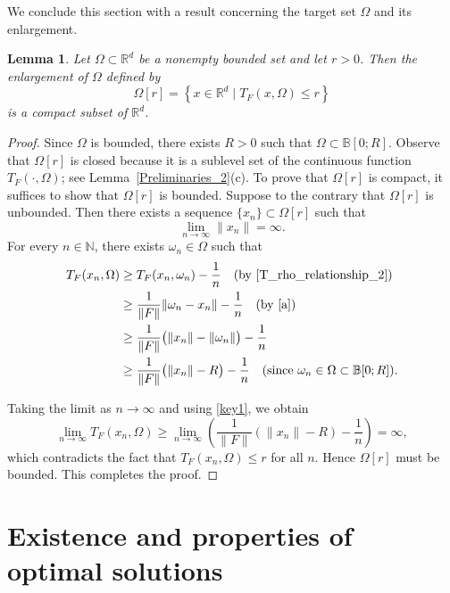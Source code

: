 \documentclass[sn-mathphys-num]{sn-jnl}%
\newtheorem{lemma}[theorem]{Lemma}
\theoremstyle{definition}
\begin{document}
We conclude this section with a result concerning the target set $\Omega$ and its enlargement.

\begin{lemma} 
	\label{G.O.Solution_1}
	Let $\Omega \subset \mathbb{R}^d$ be a nonempty bounded set and let $r>0$. 
	Then the enlargement of $\Omega$ defined by
	\begin{equation} 
		\label{enlargement}
		\Omega[r] = \left\{ x \in \mathbb{R}^d \mid T_F(x,\Omega) \le r \right\}
	\end{equation}
	is a compact subset of $\mathbb{R}^d$.
\end{lemma}

\begin{proof}
	Since $\Omega$ is bounded, there exists $R>0$ such that 
	$\Omega \subset \mathbb{B}[0;R]$. 
	Observe that $\Omega[r]$ is closed because it is a sublevel set of the 
	continuous function $T_F(\cdot,\Omega)$; see Lemma~\ref{Preliminaries_2}(c). 
	To prove that $\Omega[r]$ is compact, it suffices to show that $\Omega[r]$ is bounded.
	Suppose to the contrary that $\Omega[r]$ is unbounded. 
	Then there exists a sequence $\{x_n\}\subset \Omega[r]$ such that
	\begin{equation}
		\label{key1}
		\lim_{n\to\infty}\|x_n\|=\infty .
	\end{equation}
	For every $n\in\mathbb{N}$, there exists $\omega_n\in\Omega$ such that
	\[
	\begin{aligned}
		T_F(x_n,\Omega)
		&\ge T_F(x_n,\omega_n)-\frac1n 
		\quad (\text{by } \eqref{T_rho_relationship_2})\\
		&\ge \frac{1}{\|F\|}\|\omega_n-x_n\|-\frac1n 
		\quad (\text{by }\eqref{a})\\
		&\ge \frac{1}{\|F\|}\big(\|x_n\|-\|\omega_n\|\big)-\frac1n\\
		&\ge \frac{1}{\|F\|}\big(\|x_n\|-R\big)-\frac1n
		\quad (\text{since } \omega_n\in\Omega\subset\mathbb{B}[0;R]).
	\end{aligned}
	\]
	
	Taking the limit as $n\to\infty$ and using \eqref{key1}, we obtain
	\[
	\lim_{n\to\infty}T_F(x_n,\Omega)
	\ge
	\lim_{n\to\infty}
	\left(
	\frac{1}{\|F\|}(\|x_n\|-R)-\frac1n
	\right)
	=\infty,
	\]
	which contradicts the fact that $T_F(x_n,\Omega)\le r$ for all $n$.
	Hence $\Omega[r]$ must be bounded. This completes the proof. 
\end{proof}

\section{Existence and properties of optimal solutions}\label{exist}
\end{document}

